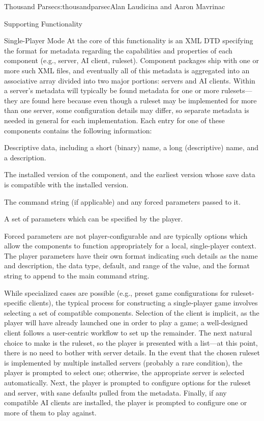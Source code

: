 \begin{aosachapter}{Thousand Parsec}{s:thousandparsec}{Alan Laudicina and Aaron Mavrinac}
\begin{aosasect1}{Supporting Functionality}
\begin{aosasect2}{Single-Player Mode}
At the core of this functionality is an XML DTD specifying the format
for metadata regarding the capabilities and properties of each
component (e.g., server, AI client, ruleset). Component packages ship
with one or more such XML files, and eventually all of this metadata
is aggregated into an associative array divided into two major
portions: servers and AI clients. Within a server's metadata will
typically be found metadata for one or more rulesets---they are found
here because even though a ruleset may be implemented for more than
one server, some configuration details may differ, so
separate metadata is needed in general for each implementation.
Each entry for one of these components contains the following information:

\begin{aosaitemize}

  \item Descriptive data, including a short (binary) name, a long
  (descriptive) name, and a description.

  \item The installed version of the component, and the earliest
  version whose save data is compatible with the installed version.

  \item The command string (if applicable) and any forced parameters
  passed to it.

  \item A set of parameters which can be specified by the player.

\end{aosaitemize}

Forced parameters are not player-configurable and are typically
options which allow the components to function appropriately for a
local, single-player context. The player parameters have their own
format indicating such details as the name and description, the data
type, default, and range of the value, and the format string to append
to the main command string.

While specialized cases are possible (e.g., preset game configurations
for ruleset-specific clients), the typical process for constructing a
single-player game involves selecting a set of compatible
components. Selection of the client is implicit, as the player will
have already launched one in order to play a game; a well-designed
client follows a user-centric workflow to set up the remainder. The
next natural choice to make is the ruleset, so the player is presented
with a list---at this point, there is no need to bother with server
details. In the event that the chosen ruleset is implemented by
multiple installed servers (probably a rare condition), the player is
prompted to select one; otherwise, the appropriate server is selected
automatically. Next, the player is prompted to configure options for
the ruleset and server, with sane defaults pulled from the
metadata. Finally, if any compatible AI clients are installed, the
player is prompted to configure one or more of them to play against.


\end{aosasect2}
\end{aosasect1}
\end{aosachapter}
